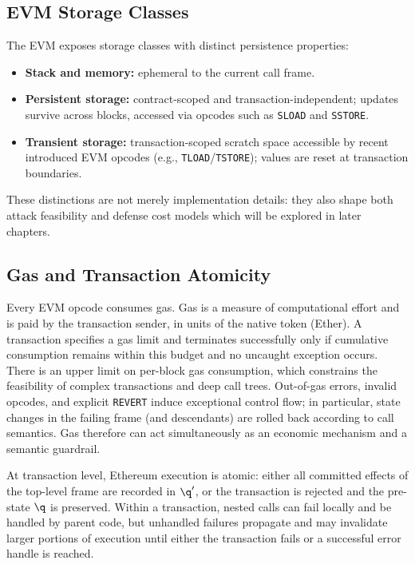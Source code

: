 \subsection{EVM Storage Classes}
The EVM exposes storage classes with distinct 
persistence properties:
\begin{itemize}
    \item \textbf{Stack and memory:} 
    ephemeral to the current call frame.
    \item \textbf{Persistent storage:} 
    contract-scoped and transaction-independent; 
    updates survive across blocks, accessed via
    opcodes such as \texttt{SLOAD} and \texttt{SSTORE}.
    \item \textbf{Transient storage:} 
    transaction-scoped scratch space accessible 
    by recent introduced EVM opcodes 
    (e.g., \texttt{TLOAD}/\texttt{TSTORE}); 
    values are reset at transaction boundaries.
\end{itemize}
These distinctions are not merely implementation 
details: they also shape both attack feasibility 
and defense cost models which will be explored in later chapters.

\subsection{Gas and Transaction Atomicity}
Every EVM opcode consumes gas. Gas is a measure of 
computational effort and is paid by the transaction sender,
in units of the native token (Ether). 
 A transaction specifies 
a gas limit and terminates successfully only if 
cumulative consumption remains within this budget 
and no uncaught exception occurs. 
There is an upper limit on 
per-block gas consumption, which constrains the
feasibility of complex transactions and deep call trees.
Out-of-gas errors, invalid opcodes, and 
explicit \texttt{REVERT} induce exceptional 
control flow; in particular, state changes 
in the failing frame (and descendants) are 
rolled back according to call semantics.
Gas therefore can act simultaneously as an economic 
mechanism and a semantic guardrail. 

At transaction level, Ethereum execution 
is atomic: either all committed effects of 
the top-level frame are recorded in $\q'$, 
or the transaction is rejected and the pre-state $\q$ 
is preserved. Within a transaction, 
nested calls can fail locally and be handled by parent 
code, but unhandled failures propagate and may 
invalidate larger portions of execution until either 
the transaction fails or a successful error handle is reached.

